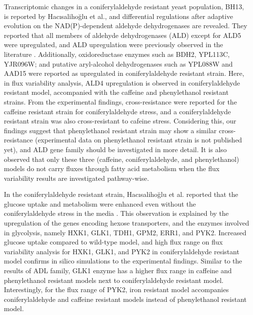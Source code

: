 Transcriptomic changes in a coniferylaldehyde resistant yeast population, BH13, is reported by Hacısalihoğlu et al., and differential regulations after adaptive evolution on the NAD(P)-dependent aldehyde dehydrogenases are revealed. They reported that all members of aldehyde dehydrogenases (ALD) except for ALD5 were upregulated, and ALD upregulation were previously observed in the literature \cite{adeboye2015catabolism}. Additionally, oxidoreductase enzymes such as BDH2, YPL113C, YJR096W; and putative aryl-alcohol dehydrogenases such as YPL088W and AAD15 were reported as upregulated in coniferylaldehyde resistant strain. Here, in flux variability analysis, ALD4 upregulation is observed in coniferylaldehyde resistant model, accompanied with the caffeine and phenylethanol resistant strains. From the experimental findings, cross-resistance were reported for the caffeine resistant strain for coniferylaldehyde stress, and a coniferylaldehyde resistant strain was also cross-resistant to cafeine stress. Considering this, our findings suggest that phenylethanol resistant strain may show a similar cross-resistance (experimental data on phenylethanol resistant strain is not published yet), and ALD gene family should be investigated in more detail. It is also observed that only these three (caffeine, coniferylaldehyde, and phenylethanol) models do not carry fluxes through fatty acid metabolism when the flux variability results are investigated pathway-wise.

In the coniferylaldehyde resistant strain, Hacısalihoğlu et al. reported that the glucose uptake and metabolism were enhanced even without the coniferylaldehyde stress in the media \cite{Hacsaliholu2019}. This observation is explained by the upregulation of the genes encoding hexose transporters, and the enzymes involved in glycolysis, namely HXK1, GLK1, TDH1, GPM2, ERR1, and PYK2. Increased glucose uptake compared to wild-type model, and high flux range on flux variability analysis for HXK1, GLK1, and PYK2 in coniferylaldehyde resistant model confirms in silico simulations to the experimental findings. Similar to the results of ADL family, GLK1 enzyme has a higher flux range in caffeine and phenylethanol resistant models next to coniferylaldehyde resistant model. Interestingly, for the flux range of PYK2, iron resistant model accompanies coniferylaldehyde and caffeine resistant models instead of phenylethanol resistant model.


